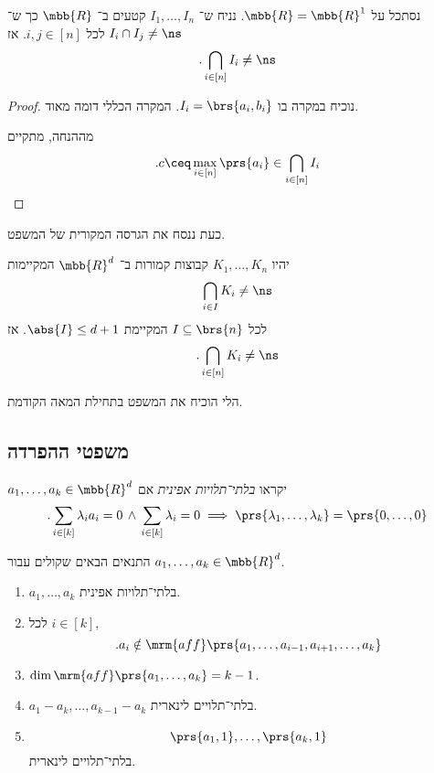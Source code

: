 \documentclass[a4paper,10pt,twoside,openany]{book}
\begin{document}
\begin{theorem}[הלי]
נסתכל על
$\mbb{R} = \mbb{R}^1$.
נניח ש־%
$I_1, \ldots, I_n$
קטעים ב־%
$\mbb{R}$
כך ש־%
$I_i \cap I_j \neq \ns$
לכל
$i,j \in [n]$.
אז
\[\text{.} \bigcap_{i \in [n]} I_i \neq \ns\]
\end{theorem}

\begin{proof}
נוכיח במקרה בו
$I_i = \brs{a_i, b_i}$.
המקרה הכללי דומה מאוד.

מההנחה, מתקיים
\[\text{.} c \ceq \max_{i \in [n]} \prs{a_i} \in \bigcap_{i \in [n]} I_i\]
\end{proof}

כעת ננסח את הגרסה המקורית של המשפט.

\begin{theorem}
יהיו
$K_1, \ldots, K_n$
קבוצות קמורות ב־%
$\mbb{R}^d$
המקיימות
\[\bigcap_{i \in I} K_i \neq \ns\]
לכל
$I \subseteq \brs{n}$
המקיימת
$\abs{I} \leq d + 1$.
אז
\[\text{.} \bigcap_{i \in [n]} K_i \neq \ns\]
\end{theorem}

הלי הוכיח את המשפט בתחילת המאה הקודמת.


\subsection{משפטי ההפרדה}

\begin{definition}[]
$a_1, \ldots, a_k \in \mbb{R}^d$
יקראו
\emph{בלתי־תלויות אפינית}
אם
\[\text{.} \sum_{i \in [k]} \lambda_i a_i =0 \, \wedge \, \sum_{i \in [k]} \lambda_i = 0 \implies \prs{\lambda_1,\ldots, \lambda_k} = \prs{0, \ldots, 0}\]
\end{definition}

\begin{proposition}
התנאים הבאים שקולים עבור
$a_1, \ldots, a_k \in \mbb{R}^d$.

\begin{enumerate}
\item $a_1,\ldots,a_k$
בלתי־תלויות אפינית.
\item לכל
$i \in [k]$,
\[\text{.} a_i \notin \mrm{aff}\prs{a_1, \ldots, a_{i-1}, a_{i+1}, \ldots, a_k}\]
\item $\dim \mrm{aff}\prs{a_1, \ldots, a_k} = k-1$.
\item $a_1 - a_k, \ldots, a_{k-1}-a_k$
בלתי־תלויים לינארית.
\item \[\prs{a_1, 1}, \ldots, \prs{a_k, 1}\]
בלתי־תלויים לינארית.
\end{enumerate}
\end{proposition}
\end{document}
